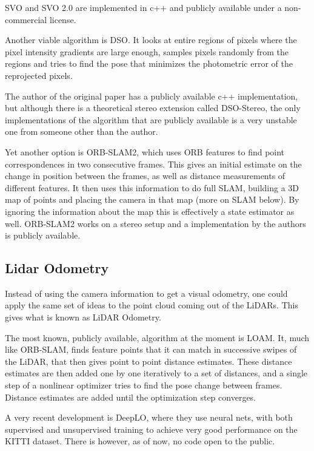 SVO and SVO 2.0 are implemented in c++ and publicly available under a non-commercial license. 

Another viable algorithm is DSO\cite{DSO}. It looks at entire regions of pixels where the pixel intensity gradients are large enough, samples pixels randomly from the regions and tries to find the pose that minimizes the photometric error of the reprojected pixels. 

The author of the original paper has a publicly available c++ implementation, but although there is a theoretical stereo extension called DSO-Stereo\cite{DSOStereo}, the only implementations of the algorithm that are publicly available is a very unstable one from someone other than the author. 

Yet another option is ORB-SLAM2\cite{ORBSLAM}, which uses ORB features\cite{ORB} to find point correspondences in two consecutive frames. This gives an initial estimate on the change in position between the frames, as well as distance measurements of different features. It then uses this information to do full SLAM, building a 3D map of points and placing the camera in that map (more on SLAM below). By ignoring the information about the map this is effectively a state estimator as well. ORB-SLAM2 works on a stereo setup and a implementation by the authors is publicly available.

\subsection{Lidar Odometry}

Instead of using the camera information to get a visual odometry, one could apply the same set of ideas to the point cloud coming out of the LiDARs. This gives what is known as LiDAR Odometry. 

The most known, publicly available, algorithm at the moment is LOAM\cite{LOAM}. It, much like ORB-SLAM, finds feature points that it can match in successive swipes of the LiDAR, that then gives point to point distance estimates. These distance estimates are then added one by one iteratively to a set of distances, and a single step of a nonlinear optimizer tries to find the pose change between frames. Distance estimates are added until the optimization step converges. 

A very recent development is DeepLO\cite{DeepLO}, where they use neural nets, with both supervised and unsupervised training to achieve very good performance on the KITTI dataset. There is however, as of now, no code open to the public.

